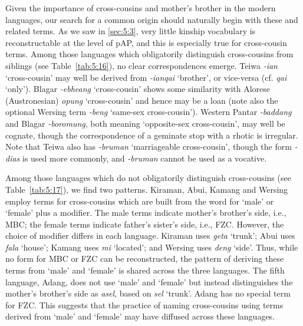 Given the importance of cross-cousins and mother's brother in the modern languages, our search for a common origin should naturally begin with these and related terms. As we saw in {\SS} \ref{sec:5:3}, very little kinship vocabulary is reconstructable at the level of pAP, and this is especially true for cross-cousin terms. Among those languages which obligatorily distinguish cross-cousins from siblings (see Table~\ref{tab:5:16}), no clear correspondences emerge. Teiwa \textit{-ian} `cross-cousin' may well be derived from \textit{-ianqai} `brother', or vice-versa (cf. \textit{qai} `only'). Blagar \textit{-ebheang} `cross-cousin' shows some similarity with Alorese (Austronesian) \textit{opung} `cross-cousin' and hence may be a loan (note also the optional Wersing term \textit{-beng} `same-sex cross-cousin'). Western Pantar \textit{-baddang} and Blagar \textit{-boromung}, both meaning `opposite-sex cross-cousin', may well be cognate, though the correspondence of a geminate stop with a rhotic is irregular. Note that Teiwa also has \textit{-bruman} `marriageable cross-cousin', though the form \textit{-dias} is used more commonly, and \textit{-bruman} cannot be used as a vocative.  

Among those languages which do not obligatorily distinguish cross-cousins (see Table~\ref{tab:5:17}), we find two patterns. Kiraman, Abui, Kamang and Wersing employ terms for cross-cousins which are built from the word for `male' or `female' plus a modifier. The male terms indicate mother's brother's side, i.e., MBC; the female terms indicate father's sister's side, i.e., FZC. However, the choice of modifier differs in each language. Kiraman uses \textit{geta} `trunk'; Abui uses \textit{fala} `house'; Kamang uses \textit{mi} `located'; and Wersing uses \textit{deng} `side'. Thus, while no form for MBC or FZC can be reconstructed, the pattern of deriving these terms from `male' and `female' is shared across the three languages. The fifth language, Adang, does not use `male' and `female' but instead distinguishes the mother's brother's side as \textit{asel}, based on \textit{sel} `trunk'. Adang has no special term for FZC. This suggests that the practice of naming cross-cousins using terms derived from `male' and `female' may have diffused across these languages.

